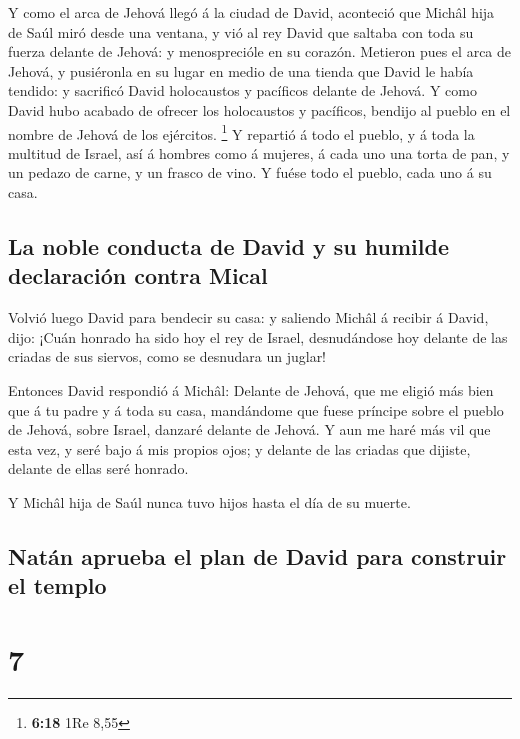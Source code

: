  Y como el arca de Jehová llegó á la ciudad de David,
aconteció que Michâl hija de Saúl miró desde una ventana, y vió al rey
David que saltaba con toda su fuerza delante de Jehová: y menosprecióle
en su corazón.  Metieron pues el arca de Jehová, y
pusiéronla en su lugar en medio de una tienda que David le había
tendido: y sacrificó David holocaustos y pacíficos delante de Jehová.
 Y como David hubo acabado de ofrecer los holocaustos y
pacíficos, bendijo al pueblo en el nombre de Jehová de los ejércitos.
\footnote{\textbf{6:18} 1Re 8,55}  Y repartió á todo el
pueblo, y á toda la multitud de Israel, así á hombres como á mujeres, á
cada uno una torta de pan, y un pedazo de carne, y un frasco de vino. Y
fuése todo el pueblo, cada uno á su casa.

\hypertarget{la-noble-conducta-de-david-y-su-humilde-declaraciuxf3n-contra-mical}{%
\subsection{La noble conducta de David y su humilde declaración contra
Mical}\label{la-noble-conducta-de-david-y-su-humilde-declaraciuxf3n-contra-mical}}

 Volvió luego David para bendecir su casa: y saliendo
Michâl á recibir á David, dijo: ¡Cuán honrado ha sido hoy el rey de
Israel, desnudándose hoy delante de las criadas de sus siervos, como se
desnudara un juglar!

 Entonces David respondió á Michâl: Delante de Jehová, que
me eligió más bien que á tu padre y á toda su casa, mandándome que fuese
príncipe sobre el pueblo de Jehová, sobre Israel, danzaré delante de
Jehová.  Y aun me haré más vil que esta vez, y seré bajo á
mis propios ojos; y delante de las criadas que dijiste, delante de ellas
seré honrado.

 Y Michâl hija de Saúl nunca tuvo hijos hasta el día de su
muerte.

\hypertarget{natuxe1n-aprueba-el-plan-de-david-para-construir-el-templo}{%
\subsection{Natán aprueba el plan de David para construir el
templo}\label{natuxe1n-aprueba-el-plan-de-david-para-construir-el-templo}}

\hypertarget{section-6}{%
\section{7}\label{section-6}}

